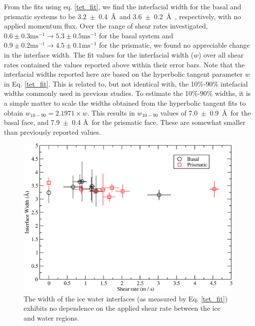 \documentclass[11pt]{article}
\begin{document}
\begin{doublespace}
From the fits using eq. \eqref{tet_fit}, we find the interfacial width
for the basal and prismatic systems to be 3.2~$\pm$~0.4~\AA\ and
3.6~$\pm$~0.2~\AA\ , respectively, with no applied momentum flux. Over
the range of shear rates investigated, $0.6 \pm 0.3 \mathrm{ms}^{-1}
\rightarrow 5.3 \pm 0.5 \mathrm{ms}^{-1}$ for the basal system and
$0.9 \pm 0.2 \mathrm{ms}^{-1} \rightarrow 4.5 \pm 0.1
\mathrm{ms}^{-1}$ for the prismatic, we found no appreciable change in
the interface width. The fit values for the interfacial width ($w$)
over all shear rates contained the values reported above within their
error bars.  Note that the interfacial widths reported here are based
on the hyperbolic tangent parameter $w$ in Eq. \ref{tet_fit}.  This is
related to, but not identical with, the 10\%-90\% intefacial widths
commonly used in previous studies.\cite{Bryk02,Bryk2004b} To estimate
the 10\%-90\% widths, it is a simple matter to scale the widths
obtained from the hyperbolic tangent fits to obtain $w_{10-90} =
2.1971 \times w$.\cite{Bryk02,Bryk2004b} This results in $w_{10-90}$
values of 7.0~$\pm$~0.9~\AA\ for the basal face, and 7.9~$\pm$~0.4
\AA\ for the prismatic face.  These are somewhat smaller than
previously reported values.

\begin{figure}
\includegraphics[width=\linewidth]{interface_width_by_shear_rate}
\caption{\label{fig:widthByShear} The width of the ice water
  interfaces (as measured by Eq. \ref{tet_fit}) exhibits no dependence
  on the applied shear rate between the ice and water regions.}
\end{figure}




\end{doublespace}
\end{document}
